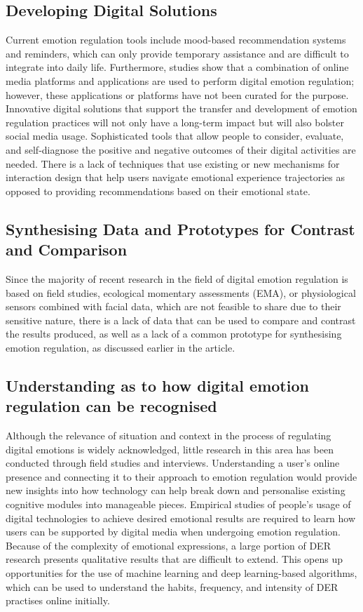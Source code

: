 \documentclass[lettersize,journal]{IEEEtran}
\begin{document}
\subsection{Developing Digital Solutions} Current emotion regulation tools include mood-based recommendation systems and reminders, which can only provide temporary assistance and are difficult to integrate into daily life. Furthermore, studies show that a combination of online media platforms and applications are used to perform digital emotion regulation; however, these applications or platforms have not been curated for the purpose. Innovative digital solutions that support the transfer and development of emotion regulation practices will not only have a long-term impact but will also bolster social media usage. Sophisticated tools that allow people to consider, evaluate, and self-diagnose the positive and negative outcomes of their digital activities are needed. There is a lack of techniques that use existing or new mechanisms for interaction design that help users navigate emotional experience trajectories as opposed to providing recommendations based on their emotional state.

\subsection{Synthesising Data and Prototypes for Contrast and Comparison} Since the majority of recent research in the field of digital emotion regulation is based on field studies, ecological momentary assessments (EMA), or physiological sensors combined with facial data, which are not feasible to share due to their sensitive nature, there is a lack of data that can be used to compare and contrast the results produced, as well as a lack of a common prototype for synthesising emotion regulation, as discussed earlier in the article.
\subsection{Understanding as to how digital emotion regulation can be recognised} Although the relevance of situation and context in the process of regulating digital emotions is widely acknowledged, little research in this area has been conducted through field studies and interviews. Understanding a user's online presence and connecting it to their approach to emotion regulation would provide new insights into how technology can help break down and personalise existing cognitive modules into manageable pieces. Empirical studies of people's usage of digital technologies to achieve desired emotional results are required to learn how users can be supported by digital media when undergoing emotion regulation. Because of the complexity of emotional expressions, a large portion of DER research presents qualitative results that are difficult to extend. This opens up opportunities for the use of machine learning and deep learning-based algorithms, which can be used to understand the habits, frequency, and intensity of DER practises online initially.
\end{document}
